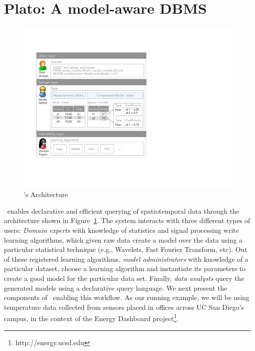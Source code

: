 
\section{Plato: A model-aware DBMS}
\label{sec:architecture}

\begin{figure}
\center
\includegraphics[width=\columnwidth]{fig-architecture2.pdf}
\caption{\projName's Architecture}
\label{fig:basic-architecture}
\vspace{-0.4cm}
\end{figure}

\projName\ enables declarative and efficient querying of spatiotemporal data through the architecture shown in Figure~\ref{fig:basic-architecture}. The system interacts with three different types of users: \emph{Domain experts} with knowledge of statistics and signal processing write learning algorithms, which given raw data create a model over the data using a particular statistical technique (e.g., Wavelets, Fast Fourier Transform, etc).
Out of these registered learning algorithms, \emph{model administrators} with knowledge of a particular dataset, choose a learning algorithm and instantiate its parameters to create a good model for the particular data set. Finally, \emph{data analysts} query the generated models using a declarative query language. We next present the components of \projName\ enabling this workflow. As our running example, we will be using temperature data collected from sensors placed in offices across UC San Diego's campus, in the context of the Energy Dashboard project\footnote{http://energy.ucsd.edu}.

